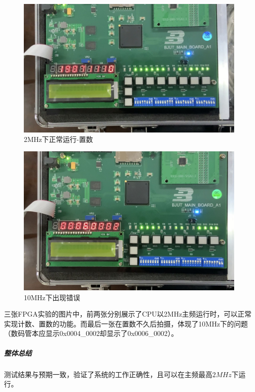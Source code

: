 \documentclass[main.tex]{subfiles}
\begin{document}
\begin{figure}[h]
\centering
\includegraphics[width=\textwidth]{images/2MHz-set.jpg}
\caption{2MHz下正常运行-置数}
\end{figure}

\begin{figure}[h]
\centering
\includegraphics[width=\textwidth]{images/10MHz-error.jpg}
\caption{10MHz下出现错误}
\end{figure}

三张FPGA实验的图片中，前两张分别展示了CPU以2MHz主频运行时，可以正常实现计数、置数的功能。而最后一张在置数不久后拍摄，体现了10MHz下的问题（数码管本应显示0x0004\_0002却显示了0x0006\_0002）。



\subparagraph{整体总结} 测试结果与预期一致，验证了系统的工作正确性，且可以在主频最高$2MHz$下运行。
\end{document}
